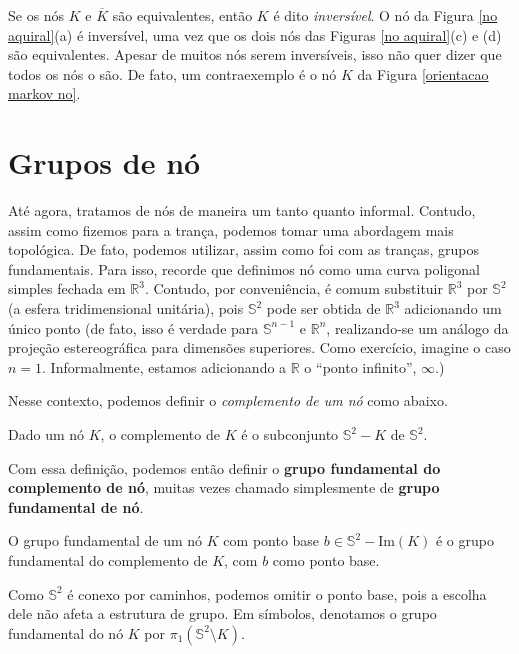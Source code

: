 	Se os nós $K$ e $\overline{K}$ são equivalentes, então $K$ é dito \textit{inversível}. 
	O nó da Figura \ref{no aquiral}(a) é inversível, uma vez que os dois nós das 
	Figuras \ref{no aquiral}(c) e (d) são equivalentes. Apesar de muitos nós serem inversíveis, 
	isso não quer dizer que todos os nós o são. De fato, um contraexemplo é o nó $K$ da 
	Figura \ref{orientacao markov no}.
	\section{Grupos de nó}
	Até agora, tratamos de nós de maneira um tanto quanto informal. Contudo, assim como 
	fizemos para a trança, podemos tomar uma abordagem mais topológica. De fato, podemos utilizar, 
	assim como foi com as tranças, grupos fundamentais. Para isso, recorde que definimos nó como 
	uma curva poligonal simples fechada em $\mathbb{R}^3$. Contudo, por conveniência, é 
	comum substituir $\mathbb{R}^3$ por $\mathbb{S}^2$ (a esfera tridimensional unitária), pois $\mathbb{S}^2$ 
	pode ser obtida de $\mathbb{R}^3$ adicionando um único ponto (de fato, isso é verdade para 
	$\mathbb{S}^{n-1}$ e $\mathbb{R}^n$, realizando-se um análogo da projeção estereográfica para 
	dimensões superiores. Como exercício, imagine o caso $n = 1$. Informalmente, estamos adicionando a
	$\mathbb{R}$ o ``ponto infinito'', $\infty$.)
	
	\par\vspace{0.3cm} Nesse contexto, podemos definir o \textit{complemento de um nó} como abaixo.
	\begin{definition}
	\label{def complemento no}
		Dado um nó $K$, o complemento de $K$ é o subconjunto $\mathbb{S}^2 - K$ de $\mathbb{S}^2$.
	\end{definition}
	Com essa definição, podemos então definir o \textbf{grupo fundamental do complemento de nó}, 
	muitas vezes chamado simplesmente de \textbf{grupo fundamental de nó}.
	\begin{definition}
	\label{grupo fundamental de no}
		O grupo fundamental de um nó $K$ com ponto base $b\in\mathbb{S}^2 - \text{Im}(K)$ 
		é o grupo fundamental do complemento de $K$, com $b$ como ponto base.
	\end{definition}
	Como $\mathbb{S}^2$ é conexo por caminhos, podemos omitir o ponto base, pois a escolha dele 
	não afeta a estrutura de grupo. Em símbolos, denotamos o grupo fundamental do nó $K$ por
	$\pi_1(\mathbb{S}^2\setminus K)$.
	
